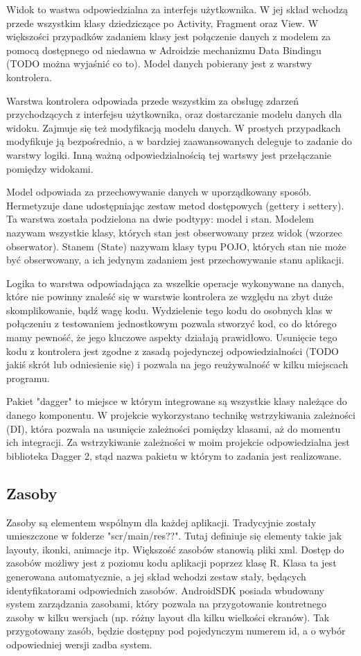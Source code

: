 \documentclass	{xmgr}
\begin{document}
Widok to wastwa odpowiedzialna za interfejs użytkownika. W jej skład wchodzą przede wszystkim klasy dziedziczące po Activity, Fragment oraz View. W większości przypadków zadaniem klasy jest połączenie danych z modelem za pomocą dostępnego od niedawna w Adroidzie mechanizmu Data Bindingu (TODO można wyjaśnić co to). Model danych pobierany jest z warstwy kontrolera.

Warstwa kontrolera odpowiada przede wszystkim za obsługę zdarzeń przychodzących z interfejsu użytkownika, oraz dostarczanie modelu danych dla widoku. Zajmuje się też modyfikacją modelu danych. W prostych przypadkach modyfikuje ją bezpośrednio, a w bardziej zaawansowanych deleguje to zadanie do warstwy logiki. Inną ważną odpowiedzialnością tej wartswy jest przełączanie pomiędzy widokami. 

Model odpowiada za przechowywanie danych w uporządkowany sposób. Hermetyzuje dane udostępniając zestaw metod dostępowych (gettery i settery). Ta warstwa została podzielona na dwie podtypy: model i stan. Modelem nazywam wszystkie klasy, których stan jest obserwowany przez widok (wzorzec obserwator). Stanem (State) nazywam klasy typu POJO, których stan nie może być obserwowany, a ich jedynym zadaniem jest przechowywanie stanu aplikacji. 

Logika to warstwa odpowiadająca za wszelkie operacje wykonywane na danych, które nie powinny znaleść się w warstwie kontrolera ze względu na zbyt duże skomplikowanie, bądź wagę kodu. Wydzielenie tego kodu do osobnych klas w połączeniu z testowaniem jednostkowym pozwala stworzyć kod, co do którego mamy pewność, że jego kluczowe aspekty działają prawidłowo. Usunięcie tego kodu z kontrolera jest zgodne z zasadą pojedynczej odpowiedzialności (TODO jakiś skrót lub odniesienie się) i pozwala na jego reużywalność w kilku miejscach programu. 

Pakiet "dagger" to miejsce w którym integrowane są wszystkie klasy należące do danego komponentu. W projekcie wykorzystano technikę wstrzykiwania zależności (DI), która pozwala na usunięcie zależności pomiędzy klasami, aż do momentu ich integracji. Za wstrzykiwanie zależności w moim projekcie odpowiedzialna jest biblioteka Dagger 2, stąd nazwa pakietu w którym to zadania jest realizowane.

\subsection{Zasoby}
Zasoby są elementem wspólnym dla każdej aplikacji. Tradycyjnie zostały umieszczone w folderze "scr/main/res??". Tutaj definiuje się elementy takie jak layouty, ikonki, animacje itp. Większość zasobów stanowią pliki xml. Dostęp do zasobów możliwy jest z poziomu kodu aplikacji poprzez klasę R. Klasa ta jest generowana automatycznie, a jej skład wchodzi zestaw stały, będących identyfikatorami odpowiednich zasobów. AndroidSDK posiada wbudowany system zarządzania zasobami, który pozwala na przygotowanie kontretnego zasoby w kilku wersjach (np. różny layout dla kilku wielkości ekranów). 
Tak przygotowany zasób, będzie dostępny pod pojedynczym numerem id, a o wybór odpowiedniej wersji zadba system.
\end{document}
